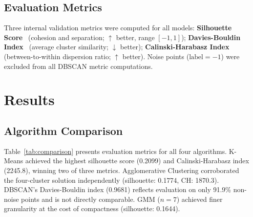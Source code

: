 \documentclass[conference]{IEEEtran}
\begin{document}
\subsection{Evaluation Metrics}

Three internal validation metrics were computed for all models:
\textbf{Silhouette Score}~\cite{rousseeuw1987silhouettes} (cohesion
and separation; $\uparrow$ better, range $[-1,1]$);
\textbf{Davies-Bouldin Index}~\cite{davies1979cluster} (average
cluster similarity; $\downarrow$ better);
\textbf{Calinski-Harabasz Index}~\cite{calinski1974dendrite}
(between-to-within dispersion ratio; $\uparrow$ better). Noise
points ($\text{label}{=}{-1}$) were excluded from all DBSCAN metric
computations.

\section{Results}
\label{sec:results}

\subsection{Algorithm Comparison}

Table~\ref{tab:comparison} presents evaluation metrics for all four
algorithms. K-Means achieved the highest silhouette score (0.2099)
and Calinski-Harabasz index (2245.8), winning two of three metrics.
Agglomerative Clustering corroborated the four-cluster solution
independently (silhouette: 0.1774, CH: 1870.3). DBSCAN's
Davies-Bouldin index (0.9681) reflects evaluation on only 91.9\%
non-noise points and is not directly comparable. GMM ($n{=}7$)
achieved finer granularity at the cost of compactness (silhouette:
0.1644).

\begin{table}[t]
\centering
\caption{Clustering Algorithm Comparison}
\label{tab:comparison}
\end{table}
\end{document}
